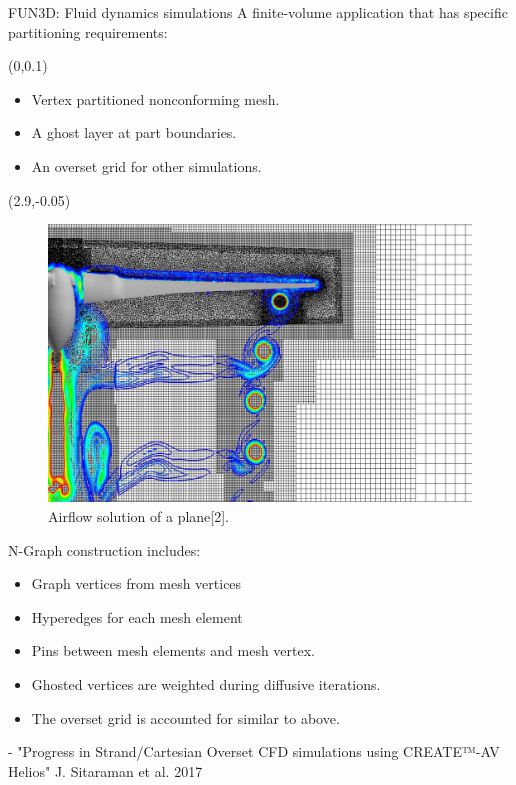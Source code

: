 \documentclass{beamer}
\begin{document}
\begin{textblock}{15.6}
\begin{textblock}{5.2}
    \begin{block}{\centering FUN3D: Fluid dynamics simulations}
      A finite-volume application that has specific partitioning requirements:
      \begin{textblock}{3.5}(0,0.1)
      \begin{itemize}
      \item Vertex partitioned nonconforming mesh.
      \item A ghost layer at part boundaries.
      \item An overset grid for other simulations.
      \end{itemize}
      \end{textblock}
      \begin{textblock}{2.5}(2.9,-0.05)
        \begin{figure}
          \centering
          \includegraphics[width=.8\textwidth]{../figures/FUN3D.jpg}
          \caption{Airflow solution of a plane[2].} 
        \end{figure}
      \end{textblock}
      \vspace{5.25cm}
      N-Graph construction includes:
      \begin{itemize}
      \item Graph vertices from mesh vertices
      \item Hyperedges for each mesh element
      \item Pins between mesh elements and mesh vertex.
      \item Ghosted vertices are weighted during diffusive iterations.
      \item The overset grid is accounted for similar to above.
      \end{itemize}
      
    \end{block}
    \vspace{-.7cm}
    {\fontsize{22}{23} - "Progress in Strand/Cartesian Overset CFD simulations using CREATE™-AV Helios" J. Sitaraman et al. 2017
    }


\end{textblock}
\end{textblock}
\end{document}

